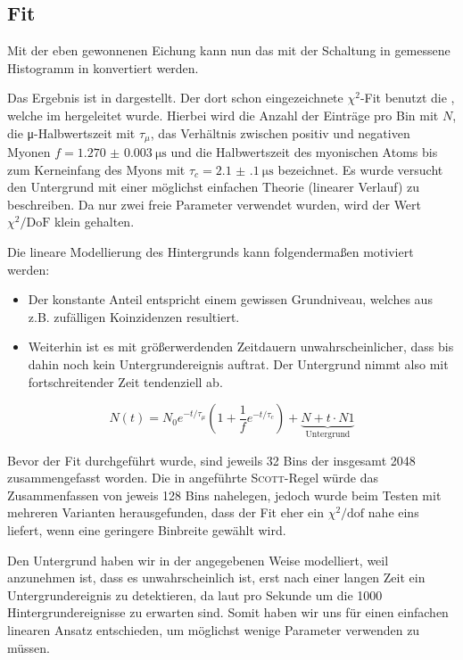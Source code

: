 \subsection{Fit}
\label{sec:fit}

Mit der eben gewonnenen Eichung kann nun das mit der Schaltung in
 gemessene Histogramm in  konvertiert werden.

Das Ergebnis ist in  dargestellt. Der dort schon eingezeichnete
$\chi^2$-Fit benutzt die , welche im \cite[Gl. 12]{script} hergeleitet wurde.
Hierbei wird die Anzahl der Einträge pro Bin mit $N$, die μ-Halbwertszeit mit
$τ_μ$, das Verhältnis zwischen positiv und negativen Myonen
$f = \SI{1.270(3)}{\micro\second}$ und die Halbwertszeit des myonischen Atoms
bis zum Kerneinfang des Myons mit $τ_c = \SI{2.1(1)}{\micro\second}$ bezeichnet.
Es wurde versucht den Untergrund mit einer möglichst einfachen Theorie
(linearer Verlauf) zu beschreiben. Da nur zwei freie Parameter verwendet wurden,
wird der Wert $\chi^2/\mbox{DoF}$ klein gehalten.

Die lineare Modellierung des Hintergrunds kann folgendermaßen motiviert werden:
\begin{itemize}
 \item Der konstante Anteil entspricht einem gewissen Grundniveau, welches aus
       z.B. zufälligen Koinzidenzen resultiert.
 \item Weiterhin ist es mit größerwerdenden Zeitdauern unwahrscheinlicher, dass bis
       dahin noch kein Untergrundereignis auftrat. Der Untergrund nimmt also mit
       fortschreitender Zeit tendenziell ab.
\end{itemize}


\begin{equation}
  N(t) = N_0 e^{-t/τ_μ}\left(1+\frac{1}{f}e^{-t/τ_c}\right) + \underbrace{N+t\cdot N1}_{\mbox{Untergrund}}
  \label{eqn:fit}
\end{equation}

Bevor der Fit durchgeführt wurde, sind jeweils 32 Bins der insgesamt 2048
zusammengefasst worden. Die in \cite[Gl. 17]{script} angeführte \textsc{Scott}-Regel
würde das Zusammenfassen von jeweis 128 Bins nahelegen, jedoch wurde beim Testen
mit mehreren Varianten herausgefunden, dass der Fit eher ein  $\chi^2/\mbox{dof}$
nahe eins liefert, wenn eine geringere Binbreite gewählt wird.

Den Untergrund haben wir in der angegebenen Weise modelliert, weil anzunehmen
ist, dass es unwahrscheinlich ist, erst nach einer langen Zeit ein
Untergrundereignis zu detektieren, da laut  pro
Sekunde um die 1000 Hintergrundereignisse zu erwarten sind. Somit haben wir uns
für einen einfachen linearen Ansatz entschieden, um möglichst wenige Parameter
verwenden zu müssen.

